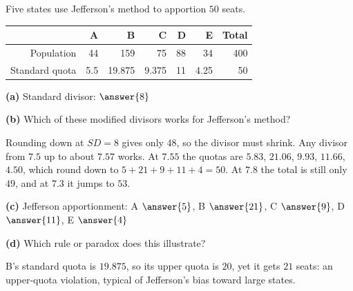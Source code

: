 \documentclass[12pt]{ximera}
\begin{document}
\begin{problem}
Five states use Jefferson's method to apportion $50$ seats.
\begin{center}
\begin{tabular}{r|rrrrrr}
 & A & B & C & D & E & Total\\\hline
Population & 44 & 159 & 75 & 88 & 34 & 400\\
Standard quota & 5.5 & 19.875 & 9.375 & 11 & 4.25 & 50
\end{tabular}
\end{center}

\begin{prompt}
\textbf{(a)} Standard divisor: $\answer{8}$
\end{prompt}

\begin{prompt}
\textbf{(b)} Which of these modified divisors works for Jefferson's method?
\begin{multipleChoice}
\end{multipleChoice}
\begin{feedback}
Rounding down at $SD=8$ gives only $48$, so the divisor must shrink. Any divisor from
$7.5$ up to about $7.57$ works. At $7.55$ the quotas are $5.83$, $21.06$, $9.93$, $11.66$,
$4.50$, which round down to $5+21+9+11+4=50$. At $7.8$ the total is still only $49$, and at $7.3$ it jumps to $53$.
\end{feedback}
\end{prompt}

\begin{prompt}
\textbf{(c)} Jefferson apportionment: A $\answer{5}$, B $\answer{21}$, C $\answer{9}$,
D $\answer{11}$, E $\answer{4}$
\end{prompt}

\begin{prompt}
\textbf{(d)} Which rule or paradox does this illustrate?
\begin{multipleChoice}
\end{multipleChoice}
\begin{feedback}
B's standard quota is $19.875$, so its upper quota is $20$, yet it gets $21$ seats: an
upper-quota violation, typical of Jefferson's bias toward large states.
\end{feedback}
\end{prompt}


\end{problem}
\end{document}
